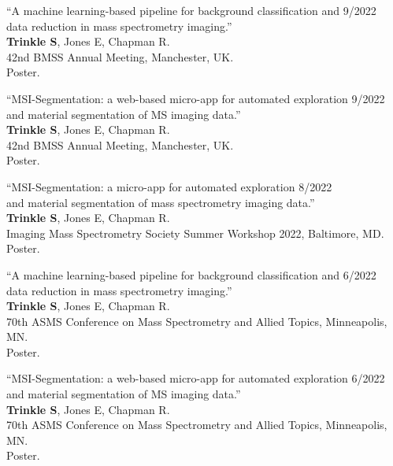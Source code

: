 \documentclass[10pt,letterpaper]{article}
\begin{document}
\begin{benumerate}{12}

\item{``A machine learning-based pipeline for background classification and \hfill 9/2022\\ data reduction in mass spectrometry imaging.''\\
    \textbf{Trinkle S}, Jones E, Chapman R.\\
    42nd BMSS Annual Meeting, Manchester, UK.\\
    Poster.}
  
\item{``MSI-Segmentation: a web-based micro-app for automated exploration \hfill 9/2022\\ and material segmentation of MS imaging data.''\\
    \textbf{Trinkle S}, Jones E, Chapman R.\\
    42nd BMSS Annual Meeting, Manchester, UK.\\
    Poster.}

\item{``MSI-Segmentation: a micro-app for automated exploration \hfill 8/2022\\ and material segmentation of mass spectrometry imaging data.''\\
    \textbf{Trinkle S}, Jones E, Chapman R.\\
    Imaging Mass Spectrometry Society Summer Workshop 2022, Baltimore, MD.\\
    Poster.}
  
\item{``A machine learning-based pipeline for background classification and \hfill 6/2022\\ data reduction in mass spectrometry imaging.''\\
    \textbf{Trinkle S}, Jones E, Chapman R.\\
    70th ASMS Conference on Mass Spectrometry and Allied Topics, Minneapolis, MN.\\
    Poster.}
  
\item{``MSI-Segmentation: a web-based micro-app for automated exploration \hfill 6/2022\\ and material segmentation of MS imaging data.''\\
    \textbf{Trinkle S}, Jones E, Chapman R.\\
    70th ASMS Conference on Mass Spectrometry and Allied Topics, Minneapolis, MN.\\
    Poster.}
  

\end{benumerate}
\end{document}
